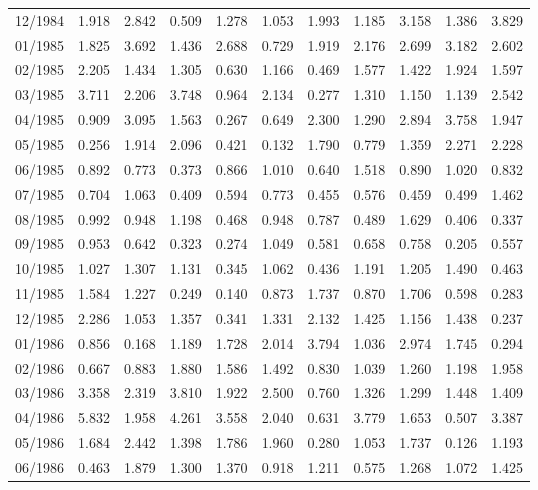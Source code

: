 \begin{tabular}{lrrrrrrrrrr}
12/1984 &  1.918 &  2.842 &  0.509 &  1.278 &  1.053 &  1.993 &  1.185 &  3.158 &  1.386 &  3.829 \\
01/1985 &  1.825 &  3.692 &  1.436 &  2.688 &  0.729 &  1.919 &  2.176 &  2.699 &  3.182 &  2.602 \\
02/1985 &  2.205 &  1.434 &  1.305 &  0.630 &  1.166 &  0.469 &  1.577 &  1.422 &  1.924 &  1.597 \\
03/1985 &  3.711 &  2.206 &  3.748 &  0.964 &  2.134 &  0.277 &  1.310 &  1.150 &  1.139 &  2.542 \\
04/1985 &  0.909 &  3.095 &  1.563 &  0.267 &  0.649 &  2.300 &  1.290 &  2.894 &  3.758 &  1.947 \\
05/1985 &  0.256 &  1.914 &  2.096 &  0.421 &  0.132 &  1.790 &  0.779 &  1.359 &  2.271 &  2.228 \\
06/1985 &  0.892 &  0.773 &  0.373 &  0.866 &  1.010 &  0.640 &  1.518 &  0.890 &  1.020 &  0.832 \\
07/1985 &  0.704 &  1.063 &  0.409 &  0.594 &  0.773 &  0.455 &  0.576 &  0.459 &  0.499 &  1.462 \\
08/1985 &  0.992 &  0.948 &  1.198 &  0.468 &  0.948 &  0.787 &  0.489 &  1.629 &  0.406 &  0.337 \\
09/1985 &  0.953 &  0.642 &  0.323 &  0.274 &  1.049 &  0.581 &  0.658 &  0.758 &  0.205 &  0.557 \\
10/1985 &  1.027 &  1.307 &  1.131 &  0.345 &  1.062 &  0.436 &  1.191 &  1.205 &  1.490 &  0.463 \\
11/1985 &  1.584 &  1.227 &  0.249 &  0.140 &  0.873 &  1.737 &  0.870 &  1.706 &  0.598 &  0.283 \\
12/1985 &  2.286 &  1.053 &  1.357 &  0.341 &  1.331 &  2.132 &  1.425 &  1.156 &  1.438 &  0.237 \\
01/1986 &  0.856 &  0.168 &  1.189 &  1.728 &  2.014 &  3.794 &  1.036 &  2.974 &  1.745 &  0.294 \\
02/1986 &  0.667 &  0.883 &  1.880 &  1.586 &  1.492 &  0.830 &  1.039 &  1.260 &  1.198 &  1.958 \\
03/1986 &  3.358 &  2.319 &  3.810 &  1.922 &  2.500 &  0.760 &  1.326 &  1.299 &  1.448 &  1.409 \\
04/1986 &  5.832 &  1.958 &  4.261 &  3.558 &  2.040 &  0.631 &  3.779 &  1.653 &  0.507 &  3.387 \\
05/1986 &  1.684 &  2.442 &  1.398 &  1.786 &  1.960 &  0.280 &  1.053 &  1.737 &  0.126 &  1.193 \\
06/1986 &  0.463 &  1.879 &  1.300 &  1.370 &  0.918 &  1.211 &  0.575 &  1.268 &  1.072 &  1.425 \\

\end{tabular}
